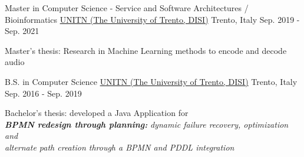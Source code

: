 

\begin{cventries}


  \cventry
    {Master in Computer Science - Service and Software Architectures / Bioinformatics} %
    {\href{https://www.unitn.it/}{UNITN (The University of Trento, DISI)}}  %
    {Trento, Italy} %
    {Sep. 2019 - Sep. 2021} %
    {
      \begin{cvitems} %
        \item {Master's thesis: Research in Machine Learning methods to encode and decode audio}
      \end{cvitems}
    }

  \cventry
    {B.S. in Computer Science} %
    {\href{https://www.unitn.it/}{UNITN (The University of Trento, DISI)}}  %
    {Trento, Italy} %
    {Sep. 2016 - Sep. 2019} %
    {
      \begin{cvitems} %
        \item {Bachelor's thesis: developed a Java Application for \\ \textbf{\textit{BPMN redesign through planning:}} \textit{dynamic failure recovery, optimization and} \\ \textit{alternate path creation through a BPMN and PDDL integration}}
      \end{cvitems}
    }


\end{cventries}
